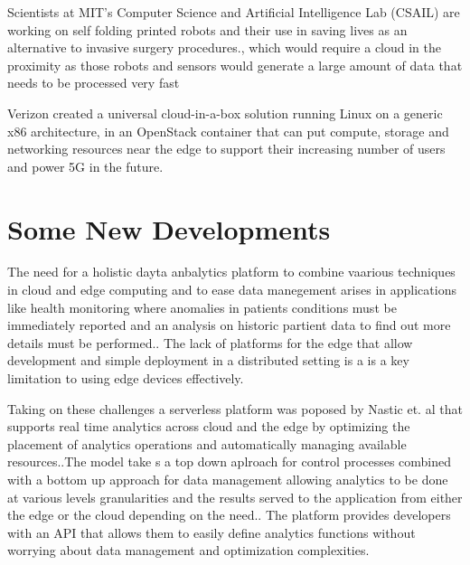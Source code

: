 \documentclass[sigconf]{acmart}
\begin{document}
Scientists at MIT's Computer Science and Artificial Intelligence Lab (CSAIL) are working on self folding printed robots and their use in saving lives as an alternative to invasive surgery procedures., which would require a cloud in the proximity as those robots and sensors would generate a large amount of data that needs to be processed very fast\cite{open_stack_living_on_edge}

Verizon created a universal cloud-in-a-box solution running Linux on a generic x86 architecture, in an OpenStack container that can put compute, storage and networking resources near the edge to support their increasing number of users and power 5G in the future.\cite{open_stack_living_on_edge}\cite{open_stack_verizon}

\section{Some New Developments}
The need for a holistic dayta anbalytics platform to combine vaarious techniques in cloud and edge computing and to ease data manegement arises in applications like health monitoring where anomalies in patients conditions must be immediately reported and an analysis on historic partient data to find out more details must be performed.\cite{ieee-serverless-platform-edge}. The lack of platforms for the edge that allow development and simple deployment in a distributed setting is a is a key limitation to using edge devices effectively\cite{ieee_iot_cloud_analytics_newsletter}.

Taking on these challenges a serverless platform was poposed by Nastic et. al that supports real time analytics across cloud and the edge by optimizing the placement of analytics operations and automatically managing available resources.\cite{ieee-serverless-platform-edge}.The model take s a top down aplroach for control processes combined with a bottom up approach for data management allowing analytics to be done at various levels granularities and the results served to the application from either the edge or the cloud depending on the need.\cite{ieee-serverless-platform-edge}. The platform provides developers with an API that allows them to easily define analytics functions without worrying about data management and optimization complexities. 
\end{document}
